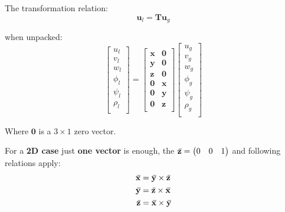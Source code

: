 \documentclass[10pt,b5paper,titlepage]{book}
\newcommand{\m}{\mathbf}
\newcommand{\closure}[2][3]{%
{}\mkern#1mu\overline{\mkern-#1mu#2}}
\newenvironment{eqarray}
{
    \begin{eqnarray}
        \begin{aligned}
}
{
        \end{aligned}
    \end{eqnarray}
}
\begin{document}
The transformation relation:
\begin{equation}
    \m{u}_l = \m{T} \m{u}_g
\end{equation}

when unpacked:
\begin{equation}
    \begin{bmatrix}
        u_l \\
        v_l \\
        w_l \\
        \phi_l \\
        \psi_l \\
        \rho_l \\
    \end{bmatrix}
    = \begin{bmatrix}
        \m{x} & \m{0} \\
        \m{y} & \m{0} \\
        \m{z} & \m{0} \\
        \m{0} & \m{x} \\
        \m{0} & \m{y} \\
        \m{0} & \m{z} \\
    \end{bmatrix}
    \begin{bmatrix}
        u_g \\
        v_g \\
        w_g \\
        \phi_g \\
        \psi_g \\
        \rho_g \\
    \end{bmatrix}
\end{equation}

Where $ \m{0} $ is a $ 3 \times 1 $ zero vector.

For a \textbf{2D case} just \textbf{one vector} is enough, the
$ \m{\closure{z}} = \begin{pmatrix} 0 & 0 & 1 \end{pmatrix} $ and following relations
apply:
\begin{eqarray}
    \m{\closure{x}} &= \m{\closure{y}} \times \m{\closure{z}} \\
    \m{\closure{y}} &= \m{\closure{z}} \times \m{\closure{x}} \\
    \m{\closure{z}} &= \m{\closure{x}} \times \m{\closure{y}} \\
\end{eqarray}
\end{document}
